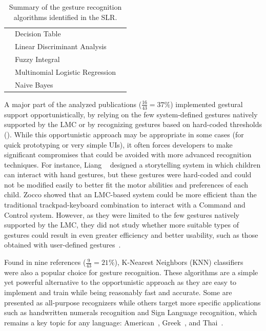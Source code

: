 \begin{table}[!b]
\begin{tabular}{llp{3.1cm}}
         & Decision Table & \cite{Li:2017c} \\
         & Linear Discriminant Analysis & \cite{Jiang:2018} \\
         & Fuzzy Integral & \cite{Li:2017c} \\
         & Multinomial Logistic Regression & \cite{Kiselev:2019} \\
         & Naive Bayes & \cite{Preventis:2014} \\
        \bottomrule
    \end{tabular}
    \caption{Summary of the gesture recognition algorithms identified in the SLR.}
    \label{tbl:state_of_the_art:lmc:algorithms}
\end{table}

A major part of the analyzed publications ($\frac{16}{43}{=}37\%$) implemented gestural support opportunistically, \ie by relying on the few system-defined gestures natively supported by the LMC or by recognizing gestures based on hard-coded thresholds (\eg \cite{Cai:2019,Galea:2018,Zhou:2018b}). While this opportunistic approach may be appropriate in some cases (\eg for quick prototyping\cite{Anthony:2012} or very simple UIs), it often forces developers to make significant compromises that could be avoided with more advanced recognition techniques. For instance, Liang \etal~\cite{Liang:2017} designed a storytelling system in which children can interact with hand gestures, but these gestures were hard-coded and could not be modified easily to better fit the motor abilities and preferences of each child. Zocco \etal\cite{Zocco:2015} showed that an LMC-based system could be more efficient than the traditional trackpad-keyboard combination to interact with a Command and Control system. However, as they were limited to the few gestures natively supported by the LMC, they did not study whether more suitable types of gestures could result in even greater efficiency and better usability, such as those obtained with user-defined gestures~\cite{Grijincu:2014}.

Found in nine references ($\frac{9}{43}{=}21\%$), K-Nearest Neighbors (KNN) classifiers~\cite{Duda:2000} were also a popular choice for gesture recognition. These algorithms are a simple yet powerful alternative to the opportunistic approach as they are easy to implement and train while being reasonably fast and accurate. Some are presented as all-purpose recognizers \cite{Caputo:2017,Taranta:2017} while others target more specific applications such as handwritten numerals recognition \cite{Chiang:2017} and Sign Language recognition, which remains a key topic for any language: American~\cite{Ferreira:2019,Kumar:2017b,Mapari:2016,Schioppo:2019}, Greek~\cite{Simos:2016}, and Thai~\cite{Thaweesitthichat:2018}.

